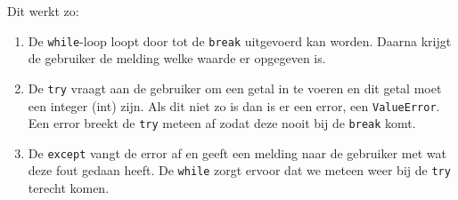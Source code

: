 Dit werkt zo:
\begin{enumerate}
	\item De \texttt{while}-loop loopt door tot de \texttt{break} uitgevoerd kan worden. Daarna krijgt de gebruiker de melding welke waarde er opgegeven is.
	\item De \texttt{try} vraagt aan de gebruiker om een getal in te voeren en dit getal moet een integer (int) zijn. Als dit niet zo is dan is er een error, een \texttt{ValueError}. Een error breekt de \texttt{try} meteen af zodat deze nooit bij de \texttt{break} komt.
	\item De \texttt{except} vangt de error af en geeft een melding naar de gebruiker met wat deze fout gedaan heeft. De \texttt{while} zorgt ervoor dat we meteen weer bij de \texttt{try} terecht komen.
\end{enumerate}

